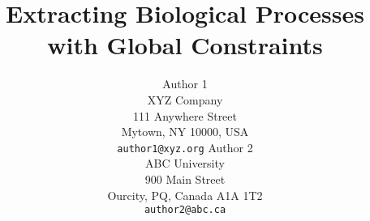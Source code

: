 \documentclass[11pt,letterpaper]{article}
\title{Extracting Biological Processes with Global Constraints}
\author{Author 1\\
	    XYZ Company\\
	    111 Anywhere Street\\
	    Mytown, NY 10000, USA\\
	    {\tt author1@xyz.org}
	  \And
	Author 2\\
  	ABC University\\
  	900 Main Street\\
  	Ourcity, PQ, Canada A1A 1T2\\
  {\tt author2@abc.ca}}
\begin{document}
\maketitle

 
 \label{sec:intro}
 \label{sec:process}
 \label{sec:model}
 \label{sec:experiment}
 \label{sec:related}
 \label{sec:conclusion}




\end{document}
